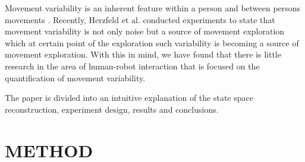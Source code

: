 \documentclass{sigchi}
\begin{document}
Movement variability is an inherent feature within a person and between persons
movements \cite{newell1993variability}. Recently, Herzfeld et al. \cite{Herzfeld2014}
conducted experiments to state that movement variability is not only noise but a
source of movement exploration which at certain point of the exploration
such variability is becoming a source of movement exploration.
With this in mind, we have found that there is little research in the area of
human-robot interaction that is focused on the quantification of movement variability.

The paper is divided into an intuitive explanation of the state space reconstruction,
experiment design, results and conclusions.



\section{METHOD}
\end{document}

